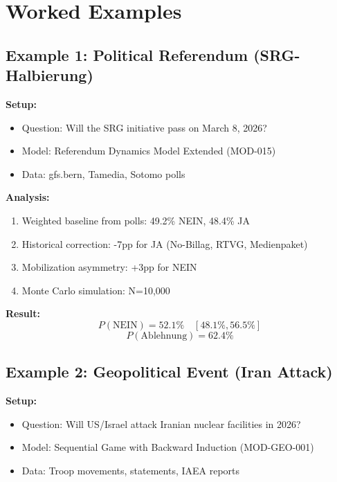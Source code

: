 \section{Worked Examples}
\label{sec:fct-examples}

\subsection{Example 1: Political Referendum (SRG-Halbierung)}

\textbf{Setup:}
\begin{itemize}
    \item Question: Will the SRG initiative pass on March 8, 2026?
    \item Model: Referendum Dynamics Model Extended (MOD-015)
    \item Data: gfs.bern, Tamedia, Sotomo polls
\end{itemize}

\textbf{Analysis:}
\begin{enumerate}
    \item Weighted baseline from polls: 49.2\% NEIN, 48.4\% JA
    \item Historical correction: -7pp for JA (No-Billag, RTVG, Medienpaket)
    \item Mobilization asymmetry: +3pp for NEIN
    \item Monte Carlo simulation: N=10,000
\end{enumerate}

\textbf{Result:}
\[
P(\text{NEIN}) = 52.1\% \quad [48.1\%, 56.5\%]
\]
\[
P(\text{Ablehnung}) = 62.4\%
\]

\subsection{Example 2: Geopolitical Event (Iran Attack)}

\textbf{Setup:}
\begin{itemize}
    \item Question: Will US/Israel attack Iranian nuclear facilities in 2026?
    \item Model: Sequential Game with Backward Induction (MOD-GEO-001)
    \item Data: Troop movements, statements, IAEA reports
\end{itemize}


